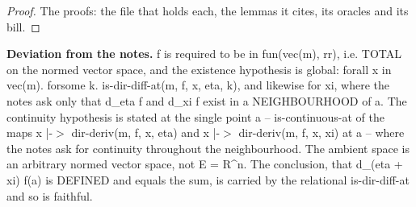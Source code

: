 %
\begin{proof}
%
The proofs: the file that holds each, the lemmas it cites, its oracles and its bill.
%
%
%
%
\end{proof}
%
\noindent\textbf{Deviation from the notes.} f is required to be in fun(vec(m), rr), i.e. TOTAL on the normed vector space, and the existence hypothesis is global: forall x in vec(m). forsome k. is-dir-diff-at(m, f, x, eta, k), and likewise for xi, where the notes ask only that d\_eta f and d\_xi f exist in a NEIGHBOURHOOD of a. The continuity hypothesis is stated at the single point a -- is-continuous-at of the maps x |-$>$ dir-deriv(m, f, x, eta) and x |-$>$ dir-deriv(m, f, x, xi) at a -- where the notes ask for continuity throughout the neighbourhood. The ambient space is an arbitrary normed vector space, not E = R\textasciicircum{}n. The conclusion, that d\_(eta + xi) f(a) is DEFINED and equals the sum, is carried by the relational is-dir-diff-at and so is faithful.
%
\renewcommand{\thethm}{2.27}
